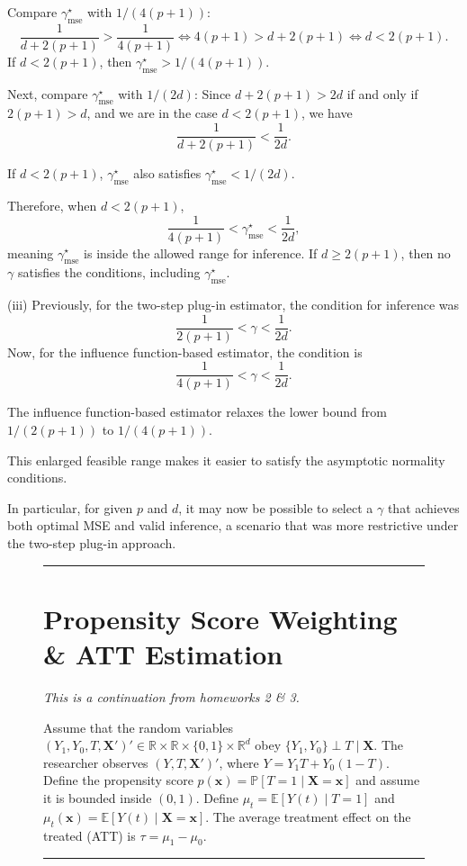 \documentclass{article}
\newenvironment{colorparagraph}[1]{\par\color{#1}}{\par}
\begin{document}
Compare \(\gamma^\star_{\text{mse}}\) with \(1/(4(p+1))\):
\[
\frac{1}{d+2(p+1)} > \frac{1}{4(p+1)} \iff 4(p+1) > d+2(p+1) \iff d<2(p+1).
\]
If \(d<2(p+1)\), then \(\gamma^\star_{\text{mse}} > 1/(4(p+1))\).

Next, compare \(\gamma^\star_{\text{mse}}\) with \(1/(2d)\):
Since \(d+2(p+1) > 2d\) if and only if \(2(p+1) > d\), and we are in the case \(d<2(p+1)\), we have
\[
\frac{1}{d+2(p+1)} < \frac{1}{2d}.
\]

If \(d<2(p+1)\), \(\gamma^\star_{\text{mse}}\) also satisfies \(\gamma^\star_{\text{mse}} < 1/(2d)\).

Therefore, when \(d<2(p+1)\),
\[
\frac{1}{4(p+1)} < \gamma^\star_{\text{mse}} < \frac{1}{2d},
\]
meaning \(\gamma^\star_{\text{mse}}\) is inside the allowed range for inference. If \(d \ge 2(p+1)\), then no \(\gamma\) satisfies the conditions, including \(\gamma^\star_{\text{mse}}\).

(iii) Previously, for the two-step plug-in estimator, the condition for inference was 
$$
\frac{1}{2(p+1)} < \gamma < \frac{1}{2d}.
$$
Now, for the influence function-based estimator, the condition is 
$$
\frac{1}{4(p+1)} < \gamma < \frac{1}{2d}.
$$

The influence function-based estimator relaxes the lower bound from \(1/(2(p+1))\) to \(1/(4(p+1))\).

This enlarged feasible range makes it easier to satisfy the asymptotic normality conditions.

In particular, for given \(p\) and \(d\), it may now be possible to select a \(\gamma\) that achieves both optimal MSE and valid inference, a scenario that was more restrictive under the two-step plug-in approach.

\begin{figure}[H]
  \begin{colorparagraph}{questioncolor}
  \rule{\textwidth}{0.5pt}
  \label{q2}
  \section{Propensity Score Weighting \& ATT Estimation}

  \textit{This is a continuation from homeworks 2 \& 3.}

  Assume that the random variables \( (Y_1, Y_0, T, \mathbf{X}')' \in \mathbb{R} \times \mathbb{R} \times \{0, 1\} \times \mathbb{R}^d \) obey \( \{Y_1, Y_0\} \perp T \mid \mathbf{X} \). The researcher observes \( (Y, T, \mathbf{X}')' \), where \( Y = Y_1 T + Y_0 (1 - T) \). Define the propensity score \( p(\mathbf{x}) = \mathbb{P}[T = 1 \mid \mathbf{X} = \mathbf{x}] \) and assume it is bounded inside \( (0, 1) \). Define \( \mu_t = \mathbb{E}[Y(t) \mid T = 1] \) and \( \mu_t(\mathbf{x}) = \mathbb{E}[Y(t) \mid \mathbf{X} = \mathbf{x}] \). The average treatment effect on the treated (ATT) is \( \tau = \mu_1 - \mu_0 \).

  \rule{\textwidth}{0.5pt}
  \end{colorparagraph}
\end{figure}
\end{document}
